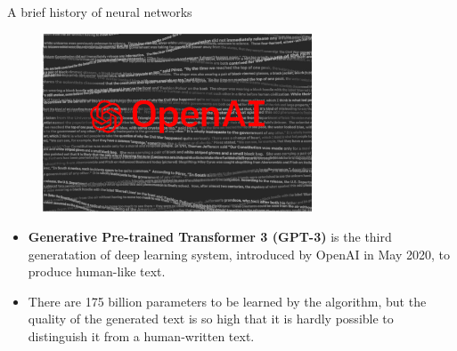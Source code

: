 \begin{vbframe}{A brief history of neural networks}
\begin{figure}
\centering
\includegraphics[width=8cm]{figure/gpt3.png}
\end{figure}
\footnotesize
\begin{itemize}
\item\textbf{Generative Pre-trained Transformer 3 (GPT-3)} is the third generatation of deep learning system, introduced by OpenAI in May 2020, to produce human-like text.
\vspace{.1cm}
\item There are 175 billion parameters to be learned by the algorithm, but the quality of the generated text is so high that it is hardly possible to distinguish it from a human-written text.
\end{itemize}
\end{vbframe}

\endlecture
